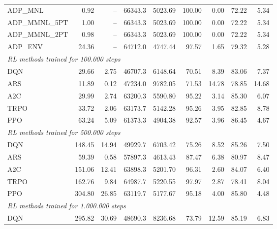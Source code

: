 \begin{samepage}
\begin{center}
\begin{tabular}{l|rr|rr|rr|rr}
    \midrule
    ADP\_MNL     &     0.92 &    -- &    66343.3 &    5023.69 &  100.00 &    0.00 &   72.22 &    5.34 \\
    ADP\_MMNL\_5PT &     1.00 &    -- &    66343.3 &    5023.69 &  100.00 &    0.00 &   72.22 &    5.34 \\
    ADP\_MMNL\_2PT &     0.98 &    -- &    66343.3 &    5023.69 &  100.00 &    0.00 &   72.22 &    5.34 \\
    ADP\_ENV     &    24.36 &    -- &    64712.0 &    4747.44 &   97.57 &    1.65 &   79.32 &    5.28 \\
    \midrule
    \multicolumn{9}{l}{\textit{RL methods trained for 100.000 steps}} \\
    \midrule
    DQN          &    29.66 &     2.75 &    46707.3 &    6148.64 &   70.51 &    8.39 &   83.06 &    7.37 \\
    ARS          &    11.89 &     0.12 &    47234.0 &    9782.05 &   71.53 &   14.78 &   78.85 &   14.68 \\
    A2C          &    29.99 &     2.74 &    63200.3 &    5590.80 &   95.22 &    3.14 &   85.30 &    6.07 \\
    TRPO         &    33.72 &     2.06 &    63173.7 &    5142.28 &   95.26 &    3.95 &   82.85 &    8.78 \\
    PPO          &    63.24 &     5.09 &    61373.3 &    4904.38 &   92.57 &    3.96 &   86.45 &    4.67 \\
    \midrule
    \multicolumn{9}{l}{\textit{RL methods trained for 500.000 steps}} \\
    \midrule
    DQN          &   148.45 &    14.94 &    49929.7 &    6703.42 &   75.26 &    8.52 &   85.26 &    7.50 \\
    ARS          &    59.39 &     0.58 &    57897.3 &    4613.43 &   87.47 &    6.38 &   80.97 &    8.47 \\
    A2C          &   151.06 &    12.41 &    63898.3 &    5201.70 &   96.31 &    2.60 &   84.07 &    6.40 \\
    TRPO         &   162.76 &     9.84 &    64987.7 &    5220.55 &   97.97 &    2.87 &   78.41 &    8.04 \\
    PPO          &   304.80 &    26.85 &    63119.7 &    5177.67 &   95.18 &    4.00 &   85.80 &    4.48 \\
    \midrule
    \multicolumn{9}{l}{\textit{RL methods trained for 1.000.000 steps}} \\
    \midrule
    DQN          &   295.82 &    30.69 &    48690.3 &    8236.68 &   73.79 &   12.59 &   85.19 &    6.83 \\

\end{tabular}
\end{center}
\end{samepage}
